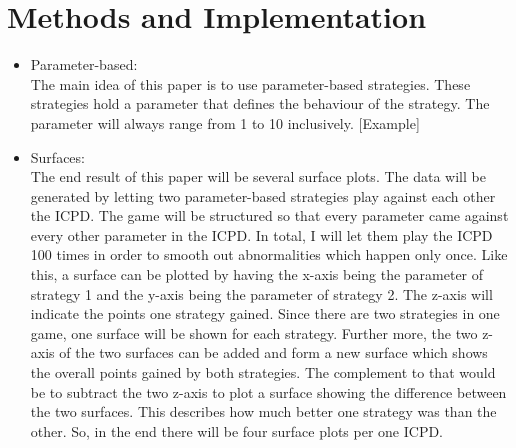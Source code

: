 \documentclass{article}
\begin{document}
\section{Methods and Implementation}
\begin{itemize}

	\item Parameter-based:\\

The main idea of this paper is to use parameter-based strategies.
These strategies hold a parameter that defines the behaviour of the strategy.
The parameter will always range from 1 to 10 inclusively.
[Example]



	\item Surfaces:\\

The end result of this paper will be several surface plots.
The data will be generated by letting two parameter-based strategies play against each other the ICPD.
The game will be structured so that every parameter came against every other parameter in the ICPD.
In total, I will let them play the ICPD 100 times in order to smooth out abnormalities which happen only once.
Like this, a surface can be plotted by having the x-axis being the parameter of strategy 1 and the y-axis being the parameter of strategy 2.
The z-axis will indicate the points one strategy gained.
Since there are two strategies in one game, one surface will be shown for each strategy.
Further more, the two z-axis of the two surfaces can be added and form a new surface which shows the overall points gained by both strategies.
The complement to that would be to subtract the two z-axis to plot a surface showing the difference between the two surfaces.
This describes how much better one strategy was than the other.
So, in the end there will be four surface plots per one ICPD.



\end{itemize}
\end{document}
